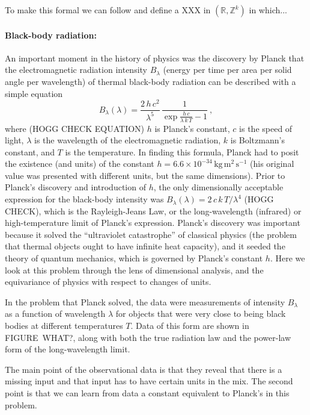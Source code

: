\documentclass{article}
\newcommand{\unit}[1]{\mathrm{#1}}
\newcommand{\kg}{\unit{kg}}
\newcommand{\m}{\unit{m}}
\newcommand{\s}{\unit{s}}
\begin{document}
To make this formal we can follow \cite{villar2022dimensionless} and define a XXX in $(\mathbb R, \mathbb Z^k)$ in which...

\paragraph{Black-body radiation:}
An important moment in the history of physics was the discovery by Planck \cite{planck} that the electromagnetic radiation intensity $B_\lambda$ (energy per time per area per solid angle per wavelength) of thermal black-body radiation can be described with a simple equation
\begin{equation}
    B_\lambda(\lambda) = \frac{2\,h\,c^2}{\lambda^5}\,\frac{1}{\exp\frac{h\,c}{\lambda\,k\,T} - 1}~,
\end{equation}
where (HOGG CHECK EQUATION)
$h$ is Planck's constant,
$c$ is the speed of light,
$\lambda$ is the wavelength of the electromagnetic radiation,
$k$ is Boltzmann's constant,
and $T$ is the temperature.
In finding this formula, Planck had to posit the existence (and units) of the constant $h=6.6\times 10^{-34}\,\kg\,\m^2\,\s^{-1}$ (his original value was presented with different units, but the same dimensions).
Prior to Planck's discovery and introduction of $h$, the only dimensionally acceptable expression for the black-body intensity was $B_\lambda(\lambda)=2\,c\,k\,T/\lambda^4$ (HOGG CHECK), which is the Rayleigh-Jeans Law, or the long-wavelength (infrared) or high-temperature limit of Planck's expression.
Planck's discovery was important because it solved the ``ultraviolet catastrophe'' of classical physics (the problem that thermal objects ought to have infinite heat capacity), and it seeded the theory of quantum mechanics, which is governed by Planck's constant $h$.
Here we look at this problem through the lens of dimensional analysis, and the equivariance of physics with respect to changes of units.

In the problem that Planck solved, the data were measurements of intensity $B_\lambda$ as a function of wavelength $\lambda$ for objects that were very close to being black bodies at different temperatures $T$.
Data of this form are shown in FIGURE~WHAT?, along with both the true radiation law and the power-law form of the long-wavelength limit.

The main point of the observational data is that they reveal that there is a missing input and that input has to have certain units in the mix. The second point is that we can learn from data a constant equivalent to Planck's in this problem. 
\end{document}
